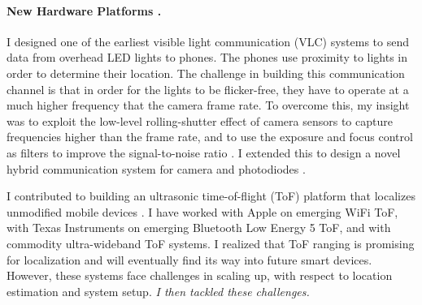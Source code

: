 \documentclass[10pt]{article}
\begin{document}

\paragraph{New Hardware Platforms . }

I designed one of the earliest visible light communication (VLC) systems to send data from overhead LED lights to phones. The phones use proximity to lights in order to determine their location.  The challenge in building this communication channel is that in order for the lights to be flicker-free, they have to operate at a much higher frequency that the camera frame rate. %
To overcome this, my insight was to exploit the low-level rolling-shutter effect of camera sensors to capture frequencies higher than the frame rate, %
 and to use the exposure and focus control as filters to improve the signal-to-noise ratio \cite{rajagopal2014visual, rajagopal2014demonstration}. I extended this to design a novel hybrid communication system for camera and photodiodes \cite{rajagopal2014hybrid}. 

I contributed to building an ultrasonic time-of-flight (ToF) platform that localizes unmodified mobile devices \cite{rtas-alps-platform, lazik2015alps,lazik2015alpsdemo}.  I have worked with Apple on emerging WiFi ToF, with Texas Instruments on emerging Bluetooth Low Energy 5 ToF, and with commodity ultra-wideband ToF systems. I realized that ToF ranging is promising for localization and will eventually find its way into future smart devices.  However, these systems face challenges in scaling up, with respect to location estimation and system setup. \textit{I then tackled these challenges.} 
\end{document}
